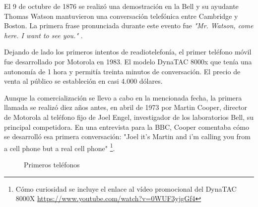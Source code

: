 El 9 de octubre de 1876 se realizó una demostración en la Bell y su ayudante Thomas Watson mantuvieron una conversación telefónica entre Cambridge y Boston. La primera frase pronunciada durante este evento fue \textit{"Mr. Watson, come here. I want to see you."} \cite{Even01}.

Dejando de lado los primeros intentos de readiotelefonía, el primer teléfono móvil fue desarrollado por Motorola en 1983. El modelo \ac{DynaTAC} 8000x que tenía una autonomía de 1 hora y permitía treinta minutos de conversación. El precio de venta al público se estableción en casi 4.000 dólares.

Aunque la comercialización se llevo a cabo en la  mencionada fecha, la primera llamada se realizó diez años antes, en abril de 1973 por Martin Cooper, director de Motorola al teléfono fijo de Joel Engel, investigador de los laboratorios Bell, su principal competidora. En una entrevista para la BBC, Cooper comentaba cómo se desarrolló esa primera conversación: "Joel it's Martin and i'm calling you from a cell phone but a real cell phone" \cite{BBC13}\footnote{Cómo curiosidad se incluye el enlace al vídeo promocional del DynaTAC 8000X \url{https://www.youtube.com/watch?v=0WUF3yjgGf4}}.

\begin{figure}[h!btp]
	\begin{adjustbox}{minipage=\linewidth, fbox}
		\centering
		\hspace{10mm}
	\end{adjustbox}
\caption{Primeros teléfonos}
	\label{fig:primeros-teléfonos}
\end{figure}


